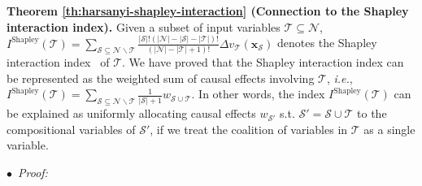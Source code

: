 \noindent\textbf{Theorem \ref{th:harsanyi-shapley-interaction} (Connection to the Shapley interaction index).} Given a subset of input variables {\small $\mathcal{T} \subseteq \mathcal{N}$}, {\small $I^{\textrm{Shapley}}(\mathcal{T})=\sum_{\mathcal{S}\subseteq \mathcal{N}\backslash \mathcal{T}}\frac{|\mathcal{S}|!(|\mathcal{N}|-|\mathcal{S}|-|\mathcal{T}|)!}{(|\mathcal{N}|-|\mathcal{T}|+1)!}\Delta v_{\mathcal{T}}(\boldsymbol{x}_{\mathcal{S}})$} denotes the Shapley interaction index~\cite{grabisch1999axiomatic} of {\small $\mathcal{T}$}.
We have proved that the Shapley interaction index can be represented as the weighted sum of causal effects involving {\small$\mathcal{T}$}, \emph{i.e.}, {\small $I^{\textrm{Shapley}}(\mathcal{T})=\sum_{\mathcal{S}\subseteq \mathcal{N} \backslash\mathcal{T}}\frac{1}{|\mathcal{S}|+1}w_{\mathcal{S}\cup \mathcal{T}}$}.
In other words, the index {\small$I^{\textrm{Shapley}}(\mathcal{T})$} can be explained as uniformly allocating causal effects {\small$w_{\mathcal{S}'}$} s.t. {\small$\mathcal{S}'=\mathcal{S}\cup \mathcal{T}$} to the compositional variables of {\small$\mathcal{S}'$}, if we treat the coalition of variables in {\small $\mathcal{T}$} as a single variable.

$\bullet$~\textit{Proof:}


